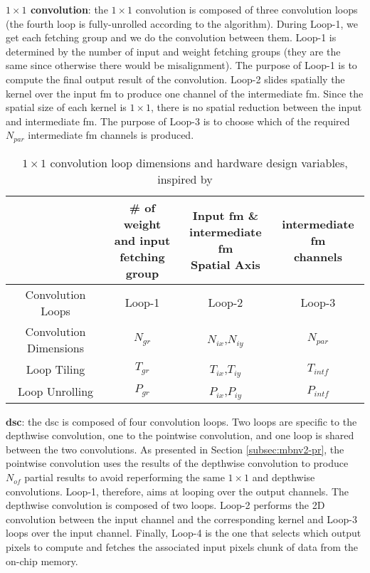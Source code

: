 \textbf{$1 \times 1$ convolution}: the $1 \times 1$ convolution is composed of three convolution loops (the fourth loop is fully-unrolled according to the algorithm). During Loop-1, we get each fetching group and we do the convolution between them. Loop-1 is determined by the number of input and weight fetching groups (they are the same since otherwise there would be misalignment). The purpose of Loop-1 is to compute the final output result of the convolution. Loop-2 slides spatially the kernel over the input \acrshort{fm} to produce one channel of the intermediate \acrshort{fm}. Since the spatial size of each kernel is $1 \times 1$, there is no spatial reduction between the input and intermediate \acrshort{fm}. The purpose of Loop-3 is to choose which of the required $N_{par}$ intermediate \acrshort{fm} channels is produced.
%
\begin{table}[H]
    \centering
    \begin{tabular}{c|c|c|c}
    \hline \hline
    & \makecell{\# of weight \\ and input \\ fetching group} & \makecell{Input \acrshort{fm} \& \\ intermediate \acrshort{fm} \\ Spatial Axis} & \makecell{intermediate \acrshort{fm} \\ channels} \\
    \hline
    Convolution Loops & Loop-1 & Loop-2 & Loop-3 \\
    Convolution Dimensions & $N_{gr}$ & $N_{ix}$,$N_{iy}$ & $N_{par}$ \\
    Loop Tiling            & $T_{gr}$ & $T_{ix}$,$T_{iy}$ & $T_{intf}$ \\
    Loop Unrolling         & $P_{gr}$ & $P_{ix}$,$P_{iy}$ & $P_{intf}$ \\
    \hline \hline
    \end{tabular}
    \caption{$1 \times 1$ convolution loop dimensions and hardware design variables, inspired by \cite{ma_optimizing_2018}}
    \label{tab:param_c11}
\end{table}
%
\textbf{\acrshort{dsc}}: the \acrshort{dsc} is composed of four convolution loops. Two loops are specific to the depthwise convolution, one to the pointwise convolution, and one loop is shared between the two convolutions. As presented in Section \ref{subsec:mbnv2-pr}, the pointwise convolution uses the results of the depthwise convolution to produce $N_{of}$ partial results to avoid reperforming the same $1 \times 1$ and depthwise convolutions. Loop-1, therefore, aims at looping over the output channels. The depthwise convolution is composed of two loops. Loop-2 performs the 2D convolution between the input channel and the corresponding kernel and Loop-3 loops over the input channel. Finally, Loop-4 is the one that selects which output pixels to compute and fetches the associated input pixels chunk of data from the on-chip memory.
